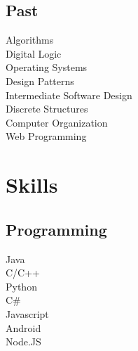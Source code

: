 \documentclass[letterpaper]{deedy-resume} %
\begin{document}
\begin{minipage}[t]{0.33\textwidth}
\sectionspace %


\subsection{Past}

Algorithms \\
Digital Logic \\
Operating Systems \\
Design Patterns \\
Intermediate Software Design \\
Discrete Structures \\
Computer Organization \\
Web Programming \\

\sectionspace %


\section{Skills}

\subsection{Programming}

Java \\
C/C++ \\
Python \\
C\# \\
Javascript \\
Android \\
Node.JS \\
\sectionspace %


\end{minipage} %
\hfill
%
%
\end{document}
